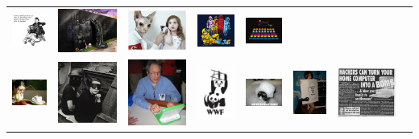 \documentclass{beamer}
\begin{document}
\begin{frame}
\begin{tabular}{cccccccc}
    \includegraphics[height=.3in,width=.3in,keepaspectratio]{../images/36.png} &
    \includegraphics[height=.3in,width=.3in,keepaspectratio]{../images/37.jpg} &
    \includegraphics[height=.3in,width=.3in,keepaspectratio]{../images/38.jpg} &
    \includegraphics[height=.3in,width=.3in,keepaspectratio]{../images/39.png} &
    \includegraphics[height=.3in,width=.3in,keepaspectratio]{../images/40.jpg} \\
    \includegraphics[height=.3in,width=.3in,keepaspectratio]{../images/41.png} &
    \includegraphics[height=.3in,width=.3in,keepaspectratio]{../images/42.jpg} &
    \includegraphics[height=.3in,width=.3in,keepaspectratio]{../images/43.jpg} &
    \includegraphics[height=.3in,width=.3in,keepaspectratio]{../images/44.jpg} &
    \includegraphics[height=.3in,width=.3in,keepaspectratio]{../images/45.jpg} &
    \includegraphics[height=.3in,width=.3in,keepaspectratio]{../images/46.jpg} &
    \includegraphics[height=.3in,width=.3in,keepaspectratio]{../images/47.jpg} &

\end{tabular}
\end{frame}
\end{document}
